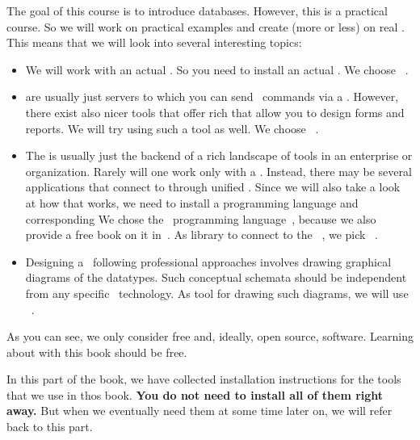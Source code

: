 %
%
%
The goal of this course is to introduce databases.
However, this is a practical course.
So we will work on practical examples and create (more or less)   on real .
This means that we will look into several interesting topics:%
%
\begin{itemize}%
%
\item We will work with an actual . %
So you need to install an actual . %
We choose \postgresql~\cite{TA2024DDAMWPAM,FP2023LP,OH2017PUAR,B2024PELUYDW}.%
%
\item {} are usually just servers to which you can send \sql\ commands via a  . %
However, there exist also nicer tools that offer rich  that allow you to design forms and reports. %
We will try using such a tool as well. %
We choose \libreofficeBase~\cite{FNFHWSKLSSGLFRSRPLJG2022BG7R1BOL7C,S2022L7PFEUU}.%
%
\item The  is usually just the backend of a rich landscape of tools in an enterprise or organization. %
Rarely will one work only with a . %
Instead, there may be several applications that connect to  through unified . %
Since we will also take a look at how that works, we need to install a programming language and corresponding  %
We chose the \python\ programming language~\cite{K2018EIPFEUU,A2002PC,H2023ABGTP3P,LH2015DSAAWP}, because we also provide a free book on it in~\cite{programmingWithPython}. %
As library to connect to the \postgresql\ , we pick \psycopg~\cite{VDGE2010P}.%
%
\item Designing a \db\ following professional approaches involves drawing graphical diagrams of the datatypes.
Such conceptual schemata should be independent from any specific \dbms\ technology.
As tool for drawing such diagrams, we will use \yEd~\cite{SG2015MDAWY,Y2011YGEM}.%
%
\end{itemize}%
%
As you can see, we only consider free and, ideally, open source, software.
Learning about  with this book should be free.

In this part of the book, we have collected installation instructions for the tools that we use in thos book.
\textbf{You do not need to install all of them right away.}
But when we eventually need them at some time later on, we will refer back to this part.

